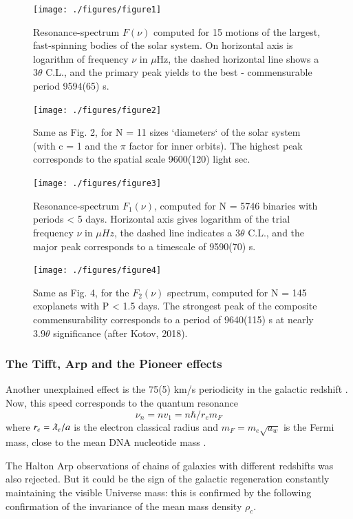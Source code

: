 \documentclass[twoside,draft]{article}
\begin{document}
\begin{sloppypar}
{\begin{figure}
\centering
\texttt{[image: ./figures/figure1]}
\caption{Resonance-spectrum $F(\nu)$ computed for 15 motions of the largest, fast-spinning bodies of
the solar system. On horizontal axis is logarithm of frequency $\nu$ in $\mu$Hz, the dashed horizontal line
shows a $ 3 \theta $ C.L., and the primary peak yields to the best - commensurable period 9594(65) s.}
\label{fig:figure_label}
\end{figure}

\begin{figure}
\centering
\texttt{[image: ./figures/figure2]}
\caption{Same as Fig. 2, for N = 11 sizes `diameters` of the solar system (with c = 1 and the $\pi$
factor for inner orbits). The highest peak corresponds to the spatial scale 9600(120) light sec.}
\label{fig:figure_label}
\end{figure}

\begin{figure}
\centering
\texttt{[image: ./figures/figure3]}
\caption{Resonance-spectrum $F_{1} ( \nu)$, computed for N = 5746 binaries with periods < 5 days.
Horizontal axis gives logarithm of the trial frequency $\nu$ in $\mu Hz$, the dashed line indicates a $3 \theta$
C.L., and the major peak corresponds to a timescale of 9590(70) s.}
\label{fig:figure_label}
\end{figure}

\begin{figure}
\centering
\texttt{[image: ./figures/figure4]}
\caption{Same as Fig. 4, for the $F_{2} ( \nu )$ spectrum, computed for N = 145 exoplanets with P < 1.5
days. The strongest peak of the composite commensurability corresponds to a period of 9640(115) s
at nearly $3.9\theta$ significance (after Kotov, 2018).}
\label{fig:figure_label}
\end{figure}

\subsubsection{The Tifft, Arp and the Pioneer effects}

Another unexplained effect is the 75(5) km/s periodicity in the galactic redshift \cite{Tifft}. Now, this
speed corresponds to the quantum resonance $$\nu_{n} = nv_{1} =n\hbar /r_{e} m_{F} $$ where $r_{e} = \lambdabar_e/a$ is the electron classical radius and $m_{F} = m_{e}\sqrt{a_{w}}$ is the Fermi mass, close to the mean DNA nucleotide mass \cite{Sanchez1}.

The Halton Arp observations of chains of galaxies with different redshifts \cite{Arp} was also
rejected. But it could be the sign of the galactic regeneration constantly maintaining the visible
Universe mass: this is confirmed by the following confirmation of the invariance of the mean mass
density $\rho_{c}$.

}
\end{sloppypar}
\end{document}
